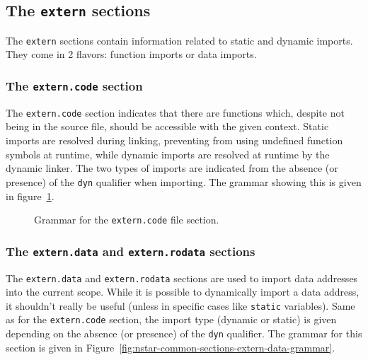 \subsection{The \texttt{extern} sections}\label{subsec:nstar-common-sections-extern}

The \texttt{extern} sections contain information related to static and dynamic imports.
They come in 2 flavors: function imports or data imports.

\subsubsection{The \texttt{extern.code} section}\label{subsubsec:nstar-common-sections-extern-code}

The \texttt{extern.code} section indicates that there are functions which, despite not being in the source file, should be accessible with the given context.
Static imports are resolved during linking, preventing from using undefined function symbols at runtime, while dynamic imports are resolved at runtime by the dynamic linker.
The two types of imports are indicated from the absence (or presence) of the \texttt{dyn} qualifier when importing.
The grammar showing this is given in figure~\ref{fig:nstar-common-sections-extern-code-grammar}.

\begin{figure}[htb]
	\centering


	\caption{Grammar for the \texttt{extern.code} file section.}
	\label{fig:nstar-common-sections-extern-code-grammar}
\end{figure}

\subsubsection{The \texttt{extern.data} and \texttt{extern.rodata} sections}\label{subsubsec:nstar-common-sections-extern-data}

The \texttt{extern.data} and \texttt{extern.rodata} sections are used to import data addresses into the current scope.
While it is possible to dynamically import a data address, it shouldn't really be useful (unless in specific cases like \texttt{static} variables).
Same as for the \texttt{extern.code} section, the import type (dynamic or static) is given depending on the absence (or presence) of the \texttt{dyn} qualifier.
The grammar for this section is given in Figure~\ref{fig:nstar-common-sections-extern-data-grammar}.

